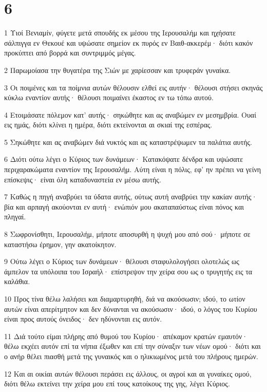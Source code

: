 \chapter{6}

\par 1 Υιοί Βενιαμίν, φύγετε μετά σπουδής εκ μέσου της Ιερουσαλήμ και ηχήσατε σάλπιγγα εν Θεκουέ και υψώσατε σημείον εκ πυρός εν Βαιθ-ακκερέμ· διότι κακόν προκύπτει από βορρά και συντριμμός μέγας.
\par 2 Παρωμοίασα την θυγατέρα της Σιών με χαρίεσσαν και τρυφεράν γυναίκα.
\par 3 Οι ποιμένες και τα ποίμνια αυτών θέλουσιν ελθεί εις αυτήν· θέλουσι στήσει σκηνάς κύκλω εναντίον αυτής· θέλουσι ποιμαίνει έκαστος εν τω τόπω αυτού.
\par 4 Ετοιμάσατε πόλεμον κατ' αυτής· σηκώθητε και ας αναβώμεν εν μεσημβρία. Ουαί εις ημάς, διότι κλίνει η ημέρα, διότι εκτείνονται αι σκιαί της εσπέρας.
\par 5 Σηκώθητε και ας αναβώμεν διά νυκτός και ας καταστρέψωμεν τα παλάτια αυτής.
\par 6 Διότι ούτω λέγει ο Κύριος των δυνάμεων· Κατακόψατε δένδρα και υψώσατε περιχαρακώματα εναντίον της Ιερουσαλήμ. Αύτη είναι η πόλις, εφ' ην πρέπει να γείνη επίσκεψις· είναι όλη καταδυναστεία εν μέσω αυτής.
\par 7 Καθώς η πηγή αναβρύει τα ύδατα αυτής, ούτως αυτή αναβρύει την κακίαν αυτής· βία και αρπαγή ακούονται εν αυτή· ενώπιόν μου ακαταπαύστως είναι πόνος και πληγαί.
\par 8 Σωφρονίσθητι, Ιερουσαλήμ, μήποτε αποσυρθή η ψυχή μου από σού· μήποτε σε καταστήσω έρημον, γην ακατοίκητον.
\par 9 Ούτω λέγει ο Κύριος των δυνάμεων· θέλουσι σταφυλολογήσει ολοτελώς ως άμπελον τα υπόλοιπα του Ισραήλ· επίστρεψον την χείρα σου ως ο τρυγητής εις τα καλάθια.
\par 10 Προς τίνα θέλω λαλήσει και διαμαρτυρηθή, διά να ακούσωσιν; ιδού, το ωτίον αυτών είναι απερίτμητον και δεν δύνανται να ακούσωσιν· ιδού, ο λόγος του Κυρίου είναι προς αυτούς όνειδος· δεν ηδύνονται εις αυτόν.
\par 11 Διά τούτο είμαι πλήρης από θυμού του Κυρίου· απέκαμον κρατών εμαυτόν· θέλω εκχέει αυτόν επί τα νήπια έξωθεν και επί την σύναξιν των νέων ομού· διότι και ο ανήρ θέλει πιασθή μετά της γυναικός και ο ηλικιωμένος μετά του πλήρους ημερών.
\par 12 Και αι οικίαι αυτών θέλουσι περάσει εις άλλους, οι αγροί και αι γυναίκες ομού, διότι θέλω εκτείνει την χείρα μου επί τους κατοίκους της γης, λέγει Κύριος.
